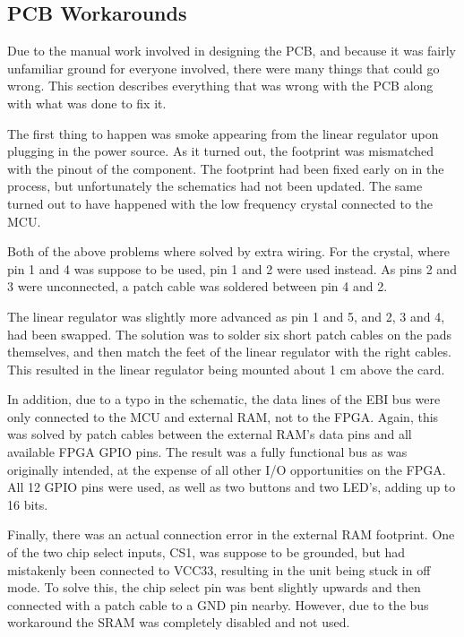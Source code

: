 
\subsection{PCB Workarounds}\label{fixes}

Due to the manual work involved in designing the PCB, and because it was fairly
unfamiliar ground for everyone involved, there were many things that could go
wrong. This section describes everything that was wrong with the PCB along with
what was done to fix it.

The first thing to happen was smoke appearing from the linear regulator upon
plugging in the power source. As it turned out, the footprint was mismatched
with the pinout of the component. The footprint had been fixed early on in the
process, but unfortunately the schematics had not been updated. The same turned
out to have happened with the low frequency crystal connected to the MCU.

Both of the above problems where solved by extra wiring. For the crystal, where
pin 1 and 4 was suppose to be used, pin 1 and 2 were used instead. As pins 2 and
3 were unconnected, a patch cable was soldered between pin 4 and 2.




The linear regulator was slightly more advanced as pin 1 and 5, and 2, 3 and 4,
had been swapped. The solution was to solder six short patch cables on the pads
themselves, and then match the feet of the linear regulator with the right
cables. This resulted in the linear regulator being mounted about 1 cm above the
card.




In addition, due to a typo in the schematic, the data lines of the EBI bus were
only connected to the MCU and external RAM, not to the FPGA. Again, this was
solved by patch cables between the external RAM's data pins and all available
FPGA GPIO pins. The result was a fully functional bus as was originally
intended, at the expense of all other I/O opportunities on the FPGA. All 12 GPIO
pins were used, as well as two buttons and two LED's, adding up to 16 bits.




Finally, there was an actual connection error in the external RAM footprint.
One of the two chip select inputs, CS1, was suppose to be grounded, but had
mistakenly been connected to VCC33, resulting in the unit being stuck in off
mode. To solve this, the chip select pin was bent slightly upwards and then
connected with a patch cable to a GND pin nearby. However, due to the bus
workaround the SRAM was completely disabled and not used.

